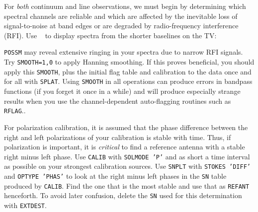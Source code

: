 For {\it both} continuum and line observations, we must begin by
determining which spectral channels are reliable and which are
affected by the inevitable loss of signal-to-noise at band edges or
are degraded by radio-frequency interference (RFI)\@.  Use {\tt
{}} to display spectra from the shorter baselines on the TV:

{\tt POSSM} may reveal extensive ringing in your spectra due to narrow
RFI signals.  Try {\tt SMOOTH=1,0} to apply Hanning smoothing.  If
this proves beneficial, you should apply this {\tt SMOOTH}, plus the
initial flag table and calibration to the data once and for all with
{\tt SPLAT}\@.  Using {\tt SMOOTH} in all operations can produce
errors in bandpass functions (if you forget it once in a while) and
will produce especially strange results when you use the
channel-dependent auto-flagging routines such as {\tt RFLAG}\@..

For polarization calibration, it is assumed that the phase difference
between the right and left polarizations of your calibration is stable
with time.  Thus, if polarization is important, it is {\it critical}
to find a reference antenna with a stable right minus left phase.
Use {\tt CALIB} with {\tt SOLMODE 'P'} and as short a time interval as
possible on your strongest calibration sources.  Use {\tt SNPLT} with
{\tt STOKES 'DIFF'} and {\tt OPTYPE 'PHAS'} to look at the right minus
left phases in the {\tt SN} table produced by {\tt CALIB}\@.  Find the
one that is the most stable and use that as {\tt REFANT} henceforth.
To avoid later confusion, delete the {\tt SN} used for this
determination with {\tt EXTDEST}\@.

